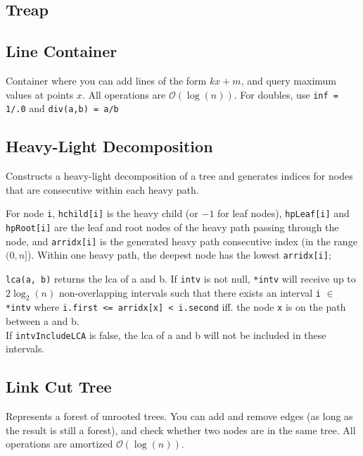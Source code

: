 \documentclass{article}
\begin{document}
\subsection*{Treap}


\subsection*{Line Container}
Container where you can add lines of the form $kx + m$, and query maximum values at points $x$.
All operations are $\mathcal{O}(\log(n))$. For doubles, use \lstinline{inf = 1/.0} and \lstinline{div(a,b) = a/b}


\newpage

\subsection*{Heavy-Light Decomposition}
Constructs a heavy-light decomposition of a tree and generates indices for nodes that are consecutive within each heavy path.

For node \lstinline{i}, \lstinline{hchild[i]} is the heavy child (or $-1$ for leaf nodes),
\lstinline{hpLeaf[i]} and \lstinline{hpRoot[i]} are the leaf and root nodes of the heavy path passing through the node,
and \lstinline{arridx[i]} is the generated heavy path consecutive index (in the range $(0,n]$).
Within one heavy path, the deepest node has the lowest \lstinline{arridx[i]};

\lstinline{lca(a, b)} returns the lca of a and b.
If \lstinline{intv} is not null, \lstinline{*intv} will receive up to $2\log_2(n)$ non-overlapping intervals
such that there exists an interval \lstinline{i} $\in$ \lstinline{*intv} where \lstinline{i.first <= arridx[x] < i.second} iff. the node \lstinline{x} is on the path between a and b.\\
If \lstinline{intvIncludeLCA} is false, the lca of a and b will not be included in these intervals.


\subsection*{Link Cut Tree}
Represents a forest of unrooted trees. You can add and remove edges (as long as the result is still a forest), and check whether two nodes are in the same tree.
All operations are amortized $\mathcal{O}(\log(n))$.
\begin{multicols}{2}

\end{multicols}
\end{document}
